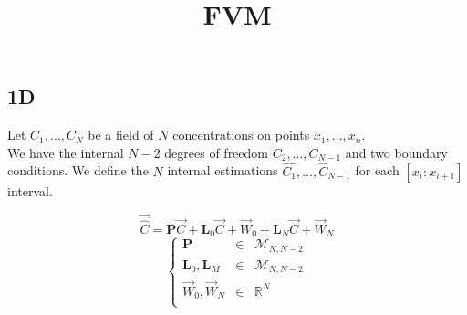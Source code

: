 \documentclass[aps,onecolumn]{revtex4}
\begin{document}
\title{FVM}
\maketitle

\subsection{1D}

\noindent Let $C_1,\ldots,C_N$ be a field of $N$ concentrations on points $x_1,\ldots,x_n$.\\
We have the internal $N-2$ degrees of freedom $C_2,\ldots,C_{N-1}$
and two boundary conditions.
We define the $N$ internal estimations $\hat{C_1},\ldots,\hat{C}_{N-1}$ for each $[x_{i}:x_{i+1}]$ interval.

\begin{equation}
	\vec{\hat{C}} = \bm{P} \vec{C} + \bm{L}_0 \vec{C} + \vec{W}_0 + \bm{L}_N \vec{C} + \vec{W}_N
\end{equation}
\begin{equation}
\left\lbrace
\begin{array}{rcl}
	\bm{P} & \in & \mathcal{M}_{N,N-2}\\
	\bm{L}_0,\bm{L}_M &\in& \mathcal{M}_{N,N-2}\\
	\vec{W}_0, \vec{W}_N &\in& \mathbb{R}^N\\
\end{array}
\right.
\end{equation}
\end{document}
